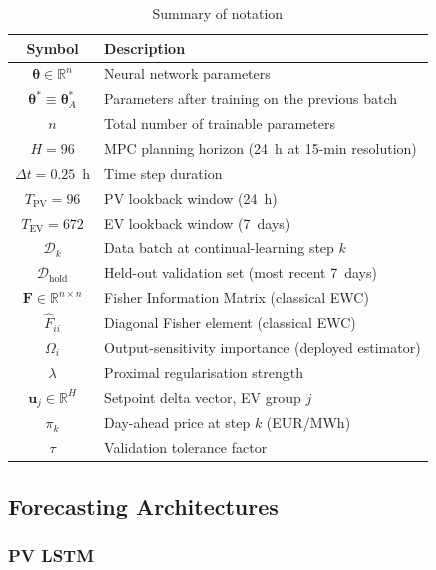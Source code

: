 \documentclass[journal]{IEEEtran}
\newcommand{\fisher}{\mathbf{F}}
\newcommand{\params}{\bm{\theta}}
\newcommand{\paramsstar}{\bm{\theta}^{*}}
\newcommand{\ewclambda}{\lambda}
\newcommand{\real}{\mathbb{R}}
\begin{document}
\begin{table}[t]
\centering
\caption{Summary of notation}
\label{tab:notation}
\begin{tabular}{@{}cl@{}}
\toprule
\textbf{Symbol} & \textbf{Description} \\
\midrule
$\params \in \real^n$ & Neural network parameters \\
$\paramsstar \equiv \params_A^*$ & Parameters after training on the previous batch \\
$n$ & Total number of trainable parameters \\
$H = 96$ & MPC planning horizon (24~h at 15-min resolution) \\
$\Delta t = 0.25$~h & Time step duration \\
$T_{\mathrm{PV}} = 96$ & PV lookback window (24~h) \\
$T_{\mathrm{EV}} = 672$ & EV lookback window (7~days) \\
$\mathcal{D}_k$ & Data batch at continual-learning step $k$ \\
$\mathcal{D}_{\mathrm{hold}}$ & Held-out validation set (most recent 7~days) \\
$\fisher \in \real^{n \times n}$ & Fisher Information Matrix (classical EWC) \\
$\hat{F}_{ii}$ & Diagonal Fisher element (classical EWC) \\
$\Omega_i$ & Output-sensitivity importance (deployed estimator) \\
$\ewclambda$ & Proximal regularisation strength \\
$\mathbf{u}_j \in \real^H$ & Setpoint delta vector, EV group $j$ \\
$\pi_k$ & Day-ahead price at step $k$ (EUR/MWh) \\
$\tau$ & Validation tolerance factor \\
\bottomrule
\end{tabular}
\end{table}

\subsection{Forecasting Architectures}
\label{sec:forecasters}

\subsubsection{PV LSTM}
\end{document}
